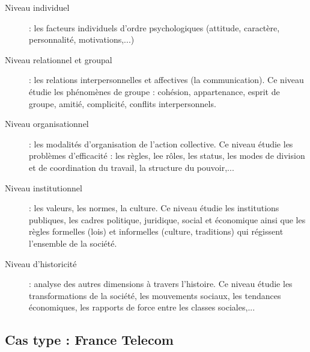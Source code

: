 \documentclass[12pt]{article}
\begin{document}
  \begin{description}
   \item[Niveau individuel] : les facteurs individuels d'ordre psychologiques (attitude, caractère, personnalité, motivations,...)
   \item[Niveau relationnel et groupal] : les relations interpersonnelles et affectives (la communication). Ce niveau étudie les phénomènes de groupe : cohésion, appartenance, esprit de groupe, amitié, complicité, conflits interpersonnels.
   \item[Niveau organisationnel] : les modalités d'organisation de l'action collective. Ce niveau étudie les problèmes d'efficacité : les règles, lee rôles, les status, les modes de division et de coordination du travail, la structure du pouvoir,... 
   \item[Niveau institutionnel] : les valeurs, les normes, la culture. Ce niveau étudie les institutions publiques, les cadres politique, juridique, social et économique ainsi que les règles formelles (lois) et informelles (culture, traditions) qui régissent l'ensemble de la société.
   \item[Niveau d'historicité] : analyse des autres dimensions à travers l'histoire. Ce niveau étudie les transformations de la société, les mouvements sociaux, les tendances économiques, les rapports de force entre les classes sociales,...
  \end{description}
  \subsection{Cas type : France Telecom}
  
\end{document}
